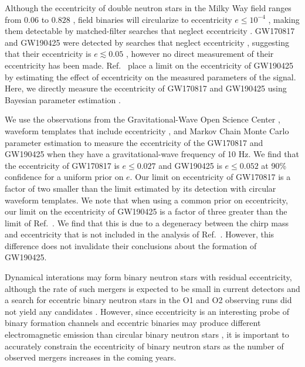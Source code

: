 Although the eccentricity of double neutron stars in the Milky Way field ranges from $0.06$ to $0.828$ \cite{Zhu:2017znf,Andrews:2019vou}, field binaries will circularize to eccentricity $e \leq 10^{-4}$ \cite{Peters:1964zz,Kowalska:2010qg}, making them detectable by matched-filter searches that neglect eccentricity \cite{Martel:1999tm,Cokelaer:2009hj,Brown:2009ng,Huerta:2013qb}.
GW170817 and GW190425 were detected by searches that neglect eccentricity \cite{TheLIGOScientific:2017qsa,Abbott:2020uma}, suggesting that their eccentricity is $e \lesssim 0.05$ \cite{Huerta:2013qb}, however no direct measurement of their eccentricity has been made. Ref.~\cite{Romero-Shaw:2020aaj} place a limit on the eccentricity of GW190425 by estimating the effect of eccentricity on the measured parameters of the signal. Here, we directly measure the eccentricity of GW170817 and GW190425 using Bayesian parameter estimation \cite{Biwer:2018osg}.

We use the observations from the Gravitational-Wave Open Science Center \cite{TheLIGOScientific:2017qsa,Abbott:2020uma}, waveform templates that include eccentricity \cite{Moore:2016qxz}, and Markov Chain Monte Carlo parameter estimation \cite{ForemanMackey:2012ig,Biwer:2018osg} to measure the eccentricity of the GW170817 and GW190425 when they have a gravitational-wave frequency of 10 Hz. We find that the eccentricity of GW170817 is $e \leq 0.027$ and GW190425 is $e \leq 0.052$ at 90\% confidence for a uniform prior on $e$. Our limit on eccentricity of GW170817 is a factor of two smaller than the limit estimated by its detection with circular waveform templates. We note that when using a common prior on eccentricity, our limit on the eccentricity of GW190425 is a factor of three greater than the limit of Ref.~\cite{Romero-Shaw:2020aaj}. We find that this is due to a degeneracy between the chirp mass and eccentricity that is not included in the analysis of Ref.~\cite{Romero-Shaw:2020aaj}. However, this difference does not invalidate their conclusions about the formation of GW190425.

Dynamical interations may form binary neutron stars with residual eccentricity, although the rate of such mergers is expected to be small in current detectors \cite{Lee:2009ca,Ye:2019xvf} and a search for eccentric binary neutron stars in the O1 and O2 observing runs did not yield any candidates \cite{Nitz:2019spj}. However, since eccentricity is an interesting probe of binary formation channels and eccentric binaries may produce different electromagnetic emission than circular binary neutron stars \cite{Radice:2016dwd,Chaurasia:2018zhg}, it is important to accurately constrain the eccentricity of binary neutron stars as the number of observed mergers increases in the coming years.

